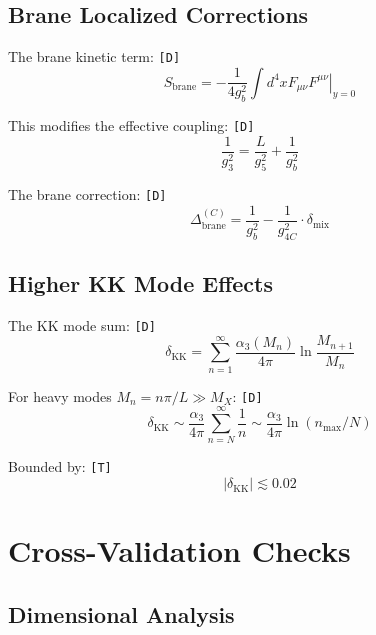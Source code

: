 \documentclass[11pt,a4paper]{article}
\newcommand{\tagD}{\textcolor{green!50!black}{\texttt{[D]}}}
\newcommand{\tagT}{\textcolor{cyan!70!black}{\texttt{[T]}}}
\theoremstyle{definition}
\begin{document}
\subsection{Brane Localized Corrections}
\label{app:brane-corrections}

The brane kinetic term: \tagD{}
\begin{equation}
\label{eq:brane-kinetic-term}
S_{\text{brane}} = -\frac{1}{4g_b^2}\int d^4x \left. F_{\mu\nu}F^{\mu\nu}\right|_{y=0}
\end{equation}

This modifies the effective coupling: \tagD{}
\begin{equation}
\label{eq:brane-mod}
\frac{1}{g_3^2} = \frac{L}{g_5^2} + \frac{1}{g_b^2}
\end{equation}

The brane correction: \tagD{}
\begin{equation}
\label{eq:brane-delta}
\Delta_{\text{brane}}^{(C)} = \frac{1}{g_b^2} - \frac{1}{g_{4C}^2}\cdot\delta_{\text{mix}}
\end{equation}

\subsection{Higher KK Mode Effects}
\label{app:kk-higher}

The KK mode sum: \tagD{}
\begin{equation}
\label{eq:kk-sum}
\delta_{\text{KK}} = \sum_{n=1}^{\infty} \frac{\alpha_3(M_n)}{4\pi}\ln\frac{M_{n+1}}{M_n}
\end{equation}

For heavy modes $M_n = n\pi/L \gg M_X$: \tagD{}
\begin{equation}
\label{eq:kk-estimate}
\delta_{\text{KK}} \sim \frac{\alpha_3}{4\pi}\sum_{n=N}^{\infty}\frac{1}{n} \sim \frac{\alpha_3}{4\pi}\ln(n_{\text{max}}/N)
\end{equation}

Bounded by: \tagT{}
\begin{equation}
\label{eq:kk-bound}
|\delta_{\text{KK}}| \lesssim 0.02
\end{equation}

\section{Cross-Validation Checks}
\label{app:cross-validation}

\subsection{Dimensional Analysis}
\label{app:dim-analysis}
\end{document}
